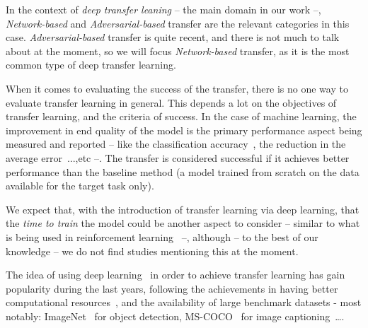   \par In the context of \textit{deep transfer leaning} -- the main domain in our work --, \textit{Network-based} and \textit{Adversarial-based} transfer are the relevant categories in this case. \textit{Adversarial-based} transfer is quite recent, and there is not much to talk about at the moment, so we will focus \textit{Network-based} transfer, as it is the most common type of deep transfer learning.

  \par When it comes to evaluating the success of the transfer, there is no one way to evaluate transfer learning in general. This depends a lot on the objectives of transfer learning, and the criteria of success. In the case of machine learning, the improvement in end quality of the model is the primary performance aspect being measured and reported -- like the classification accuracy~\citep{chattopadhyay2012multisource,long2013transfer,pan2010cross,glorot2011domain}, the reduction in the average error~\citep{pan2010domain}...,etc --. The transfer is considered successful if it achieves better performance than the baseline method (a model trained from scratch on the data available for the target task only).

  \par We expect that, with the introduction of transfer learning via deep learning, that the \textit{time to train} the model could be another aspect to consider -- similar to what is being used in reinforcement learning~\citep{taylor2007cross} --, although -- to the best of our knowledge -- we do not find studies mentioning this at the moment.

  \par The idea of using deep learning~\citep{lecun2015deep} in order to achieve transfer learning has gain popularity during the last years, following the achievements in having better computational resources~\citep{raina2009large}, and the availability of large benchmark datasets - most notably: ImageNet~\citep{imagenet_cvpr09} for object detection, MS-COCO~\citep{2014arXiv1405.0312L} for image captioning~\ldots.

